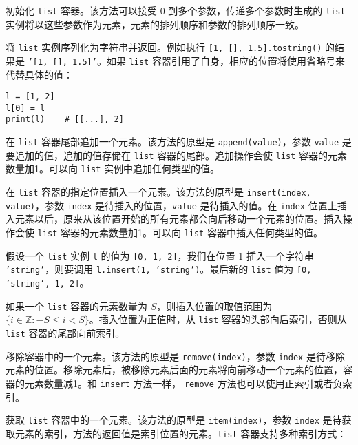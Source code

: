 
初始化 \texttt{list} 容器。该方法可以接受 0 到多个参数，传递多个参数时生成的 \texttt{list} 实例将以这些参数作为元素，元素的排列顺序和参数的排列顺序一致。


将 \texttt{list} 实例序列化为字符串并返回。例如执行 \texttt{[1, [], 1.5].tostring()} 的结果是 \texttt{'[1, [], 1.5]'}。如果 \texttt{list} 容器引用了自身，相应的位置将使用省略号来代替具体的值：
\begin{lstlisting}[language=berry, numbers=none]
l = [1, 2]
l[0] = l
print(l)    # [[...], 2]
\end{lstlisting}


在 \texttt{list} 容器尾部追加一个元素。该方法的原型是 \texttt{append(value)}，参数 \texttt{value} 是要追加的值，追加的值存储在 \texttt{list} 容器的尾部。追加操作会使 \texttt{list} 容器的元素数量加1。可以向 \texttt{list} 实例中追加任何类型的值。


在 \texttt{list} 容器的指定位置插入一个元素。该方法的原型是 \texttt{insert(index, value)}，参数 \texttt{index} 是待插入的位置，\texttt{value} 是待插入的值。在 \texttt{index} 位置上插入元素以后，原来从该位置开始的所有元素都会向后移动一个元素的位置。插入操作会使 \texttt{list} 容器的元素数量加1。可以向 \texttt{list} 容器中插入任何类型的值。

假设一个 \texttt{list} 实例 \texttt{l} 的值为 \texttt{[0, 1, 2]}，我们在位置 1 插入一个字符串 \texttt{'string'}，则要调用 \texttt{l.insert(1, 'string')}。最后新的 \texttt{list} 值为 \texttt{[0, 'string', 1, 2]}。

如果一个 \texttt{list} 容器的元素数量为 $S$，则插入位置的取值范围为 $\{i \in \mathbb{Z}: -S\leqslant i<S\}$。插入位置为正值时，从 \texttt{list} 容器的头部向后索引，否则从 \texttt{list} 容器的尾部向前索引。


移除容器中的一个元素。该方法的原型是 \texttt{remove(index)}，参数 \texttt{index} 是待移除元素的位置。移除元素后，被移除元素后面的元素将向前移动一个元素的位置，容器的元素数量减1。和 \texttt{insert} 方法一样， \texttt{remove} 方法也可以使用正索引或者负索引。


获取 \texttt{list} 容器中的一个元素。该方法的原型是 \texttt{item(index)}，参数 \texttt{index} 是待获取元素的索引，方法的返回值是索引位置的元素。\texttt{list} 容器支持多种索引方式：

